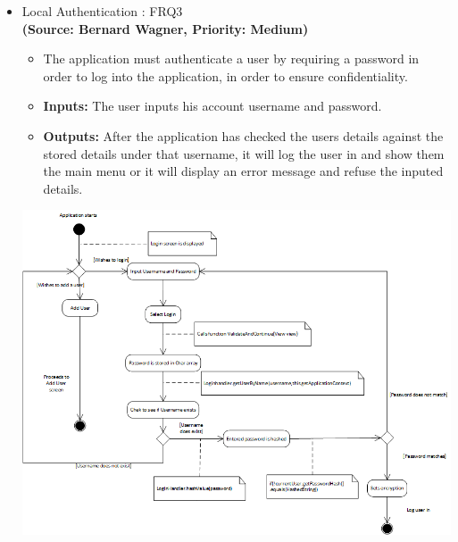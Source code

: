 \begin{itemize}
\item{Local Authentication : FRQ3}\\%
\textbf{(Source: Bernard Wagner, Priority: Medium)}
\begin{itemize}
\item The application must authenticate a user by requiring a password in order to log into the application, in order to ensure confidentiality.
\item \textbf{Inputs:} The user inputs his account username and password.
\item \textbf{Outputs:} After the application has checked the users details against the stored details under that username, it will log the user in and show them the main menu or it will display an error message and refuse the inputed details.
\end{itemize}
 \includegraphics[width=13cm]{diagrams/StateDiagrams/LocalAuthenticationStateDiagram.png}
\end{itemize}
